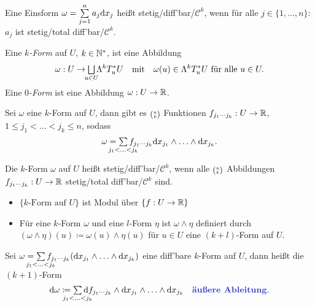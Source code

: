 \documentclass{cheat-sheet}
\newcommand{\Cont}{\mathcal{C}} %
\theoremstyle{definition}
\let\myBinom\binom
\renewcommand{\binom}[2]{\mathsmaller{\myBinom{#1}{#2}}}
\begin{document}
\begin{defn}
  Eine Einsform $\omega = \sum_{j=1}^n a_j \d x_j$ heißt stetig/diff'bar/$\Cont^k$, wenn für alle $j \in \{ 1, \ldots, n \}$: $a_j$ ist stetig/total diff'bar/$\Cont^k$.
\end{defn}
\fi


\begin{defn}
  Eine \emph{$k$-Form} auf $U$, $k \in \mathbb{N}^*$, ist eine Abbildung
  \[ \omega : U \to \bigsqcup_{\mathclap{u \in U}} \Lambda^k T_u^* U \quad \text{mit} \quad \omega(u) \in \Lambda^k T_u^* U \text{ für alle } u \in U. \]
  Eine \emph{$0$-Form} ist eine Abbildung $\omega : U \to \mathbb{R}$.
\end{defn}


\begin{beob}
  Sei $\omega$ eine $k$-Form auf $U$, dann gibt es $\binom{n}{k}$ Funktionen $f_{j_1 \cdots j_k} : U \to \mathbb{R}$, $1 \leq j_1 < \ldots < j_k \leq n$, sodass
  \[ \omega = \sum_{\mathclap{j_1 < \ldots < j_k}} f_{j_1 \cdots j_k} \d x_{j_1} \wedge \ldots \wedge \d x_{j_k}. \]
\end{beob}

\begin{defn}
  Die $k$-Form $\omega$ auf $U$ heißt stetig/diff'bar/$\Cont^k$, wenn alle $\binom{n}{k}$ Abbildungen $f_{j_1 \cdots j_k} : U \to \mathbb{R}$ stetig/total diff'bar/$\Cont^k$ sind.
\end{defn}

\begin{beob}
  \begin{itemize}
    \item $\{ k\text{-Form auf } U \}$ ist Modul über $\{ f : U \to \mathbb{R} \}$
    \item Für eine $k$-Form $\omega$ und eine $l$-Form $\eta$ ist $\omega \wedge \eta$ definiert durch $(\omega \wedge \eta)(u) \coloneqq \omega(u) \wedge \eta(u)$ für $u \in U$ eine $(k{+}l)$-Form auf $U$.
  \end{itemize}
\end{beob}

\begin{defn}
  Sei $\omega = \sum_{\mathclap{j_1 < \ldots < j_k}} f_{j_1 \cdots j_k} (\d x_{j_1} \wedge \ldots \wedge \d x_{j_k})$ eine diff'bare $k$-Form auf $U$, dann heißt die $(k{+}1)$-Form
  \[ \d \omega \coloneqq \sum_{\mathclap{j_1 < \ldots < j_k}} \d f_{j_1 \cdots j_k} \wedge \d x_{j_1} \wedge \ldots \wedge \d x_{j_k} \quad \text{\emph{äußere Ableitung}}. \]
\end{defn}
\end{document}
